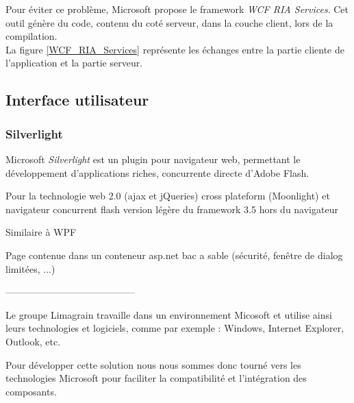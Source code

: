 Pour éviter ce problème, Microsoft propose le framework \textit{WCF RIA Services}. Cet outil génère du code, contenu du coté serveur, dans la couche client, lors de la compilation.
\\


La figure \ref{WCF_RIA_Services} représente les échanges entre la partie cliente de l'application et la partie serveur.


\subsection{Interface utilisateur}

\subsubsection{Silverlight}

Microsoft \textit{Silverlight} est un plugin pour navigateur web, permettant le développement d'applications riches, concurrente directe d'Adobe Flash.


Pour la technologie web 2.0 (ajax et jQueries)
cross plateform (Moonlight) et navigateur
concurrent flash
version légère du framework 3.5
hors du navigateur


Similaire à WPF

Page contenue dans un conteneur asp.net
bac a sable (sécurité, fenêtre de dialog limitées, ...)





-----------------------------------------



Le groupe Limagrain travaille dans un environnement Micosoft et utilise ainsi leurs technologies et logiciels, comme par exemple : Windows, Internet Explorer, Outlook, etc.

Pour développer cette solution nous nous sommes donc tourné vers les technologies Microsoft pour faciliter la compatibilité et l'intégration des composants.

